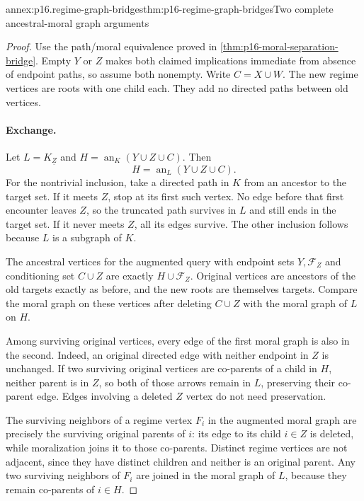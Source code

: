 \begin{annexitem}{annex:p16.regime-graph-bridges}{thm:p16-regime-graph-bridges}{Two complete ancestral-moral graph arguments}
\begin{proof}
Use the path/moral equivalence proved in
\cref{thm:p16-moral-separation-bridge}. Empty \(Y\) or \(Z\)
makes both claimed implications immediate from absence of endpoint
paths, so assume both nonempty. Write \(C=X\cup W\).
The new regime vertices are roots with one child each. They add
no directed paths between old vertices.

\paragraph{Exchange.}
Let \(L=K_{\underline Z}\) and
\(H=\operatorname{an}_K(Y\cup Z\cup C)\). Then
\[
 H=\operatorname{an}_L(Y\cup Z\cup C).
\]
For the nontrivial inclusion, take a directed path in \(K\) from
an ancestor to the target set. If it meets \(Z\), stop at its
first such vertex. No edge before that first encounter leaves \(Z\),
so the truncated path survives in \(L\) and still ends in the
target set. If it never meets \(Z\), all its edges survive.
The other inclusion follows because \(L\) is a subgraph of \(K\).

The ancestral vertices for the augmented query with endpoint sets
\(Y,\mathcal F_Z\) and conditioning set \(C\cup Z\) are
exactly \(H\cup\mathcal F_Z\). Original vertices are ancestors
of the old targets exactly as before, and the new roots are themselves
targets. Compare the moral graph on these vertices after deleting
\(C\cup Z\) with the moral graph of \(L\) on \(H\).

Among surviving original vertices, every edge of the first moral
graph is also in the second. Indeed, an original directed edge with
neither endpoint in \(Z\) is unchanged. If two surviving original
vertices are co-parents of a child in \(H\), neither parent is in
\(Z\), so both of those arrows remain in \(L\), preserving
their co-parent edge. Edges involving a deleted \(Z\) vertex
do not need preservation.

The surviving neighbors of a regime vertex \(F_i\) in the augmented
moral graph are precisely the surviving original parents of \(i\):
its edge to its child \(i\in Z\) is deleted, while moralization
joins it to those co-parents. Distinct regime vertices are not adjacent,
since they have distinct children and neither is an original parent.
Any two surviving neighbors of \(F_i\) are joined in the moral
graph of \(L\), because they remain co-parents of \(i\in H\).


\end{proof}
\end{annexitem}
